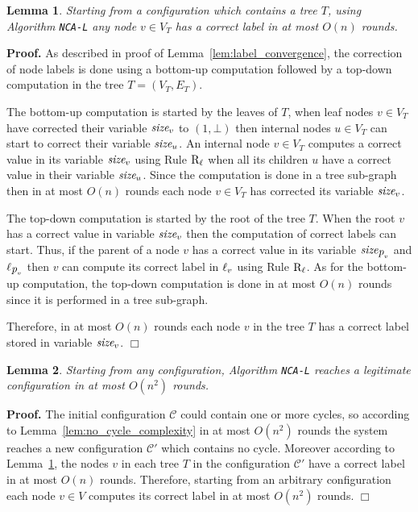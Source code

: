 \documentclass[11pt,a4paper]{article}
\newtheorem{lemma}{Lemma}
\newenvironment{proof}{\noindent \begin{rm}{\textbf{Proof.} }}{\hspace*{\fill}$\Box$\par\end{rm}}
\newcommand{\parent}{\mbox{\it p}}
\newcommand{\lab}{\mbox{\rm $\ell$}}
\newcommand{\TS}{\mbox{\it size}}
\newcommand{\LabA}{\mbox{\tt NCA-L}}
\begin{document}
\begin{lemma}
\label{lem:label_complexity}
Starting from a configuration which contains a tree $T$, using Algorithm \LabA\/ any node $v \in V_T$ has a correct label in at most $O(n)$ rounds.
\end{lemma}

\begin{proof}
As described in proof of Lemma~\ref{lem:label_convergence}, the correction of node labels is done using a bottom-up computation followed by a top-down computation in the tree $T=(V_T,E_T)$.

The bottom-up computation is started by the leaves of $T$, when leaf nodes $v \in V_T$ have corrected their variable $\TS_v$ to $(1,\bot)$ then internal nodes $u \in V_T$ can start to correct their variable $\TS_u$. An internal node $v \in V_T$ computes a correct value in its variable $\TS_v$ using Rule $\mbox{\rm R$_{\ell}$}$ when all its children $u$ have a correct value in their variable $\TS_u$. Since the computation is done in a tree sub-graph then in at most $O(n)$ rounds each node $v \in V_T$ has corrected its variable $\TS_v$.

The top-down computation is started by the root of the tree $T$. When the root $v$ has a correct value in variable $\TS_v$ then the computation of correct labels can start. Thus, if the parent of a node $v$ has a correct value in its variable $\TS_{\parent_v}$ and $\lab_{\parent_v}$ then $v$ can compute its correct label in $\lab_v$ using Rule $\mbox{\rm R$_{\ell}$}$. As for the bottom-up computation, the top-down computation is done in at most $O(n)$ rounds since it is performed in a tree sub-graph.

Therefore, in at most $O(n)$ rounds each node $v$ in the tree $T$ has a correct label stored in variable $\TS_v$.
\end{proof}

\begin{lemma}
\label{lem:label_total_complexity}
Starting from any configuration, Algorithm \LabA\/ reaches a legitimate configuration in at most $O(n^2)$ rounds.
\end{lemma}

\begin{proof}
The initial configuration $\mathcal{C}$ could contain one or more cycles, so according to Lemma~\ref{lem:no_cycle_complexity} in at most $O(n^2)$ rounds the system reaches a new configuration $\mathcal{C'}$ which contains no cycle. Moreover according to Lemma~\ref{lem:label_complexity}, the nodes $v$ in each tree $T$ in the configuration $\mathcal{C'}$ have a correct label in at most $O(n)$ rounds. Therefore, starting from an arbitrary configuration each node $v \in V$ computes its correct label in at most $O(n^2)$ rounds.
\end{proof}
\end{document}

